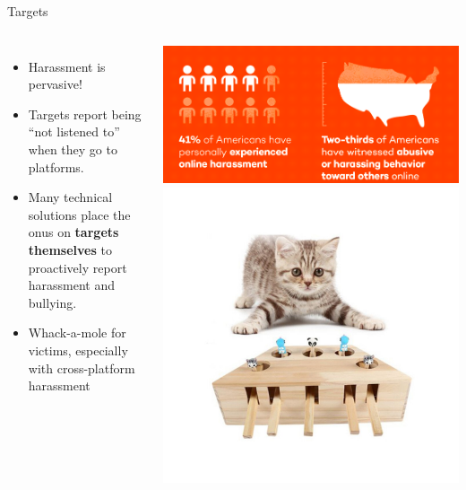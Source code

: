 \documentclass[nobackground,dvipsnames,table,aspectratio=169]{beamer}
\begin{document}
\begin{frame}{Targets}
    \begin{columns}
            \begin{itemize}
                \item Harassment is pervasive!
                \item Targets report being “not listened to” when they go to platforms.
                \item Many technical solutions place the onus on \textbf{targets themselves} to proactively report harassment and bullying.
                \item Whack-a-mole for victims, especially with cross-platform harassment 
            \end{itemize}
            \centering
            \includegraphics[width=\textwidth]{harassment-stats}
            \includegraphics[width=\textwidth]{whack-a-mole-kitten}
    \end{columns}
\end{frame}
\end{document}
